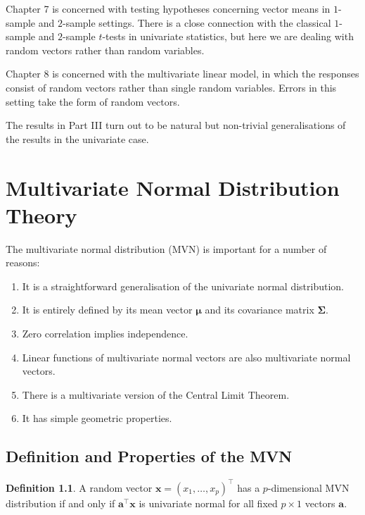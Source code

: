 \documentclass[]{book}
\providecommand{\tightlist}{%
  \setlength{\itemsep}{0pt}\setlength{\parskip}{0pt}}
\theoremstyle{definition}
\newtheorem{definition}{Definition}[chapter]
\theoremstyle{definition}
\theoremstyle{definition}
\theoremstyle{remark}
\begin{document}
Chapter 7 is concerned with testing hypotheses concerning vector means in \(1\)-sample and \(2\)-sample settings. There is a close connection with the classical \(1\)-sample and \(2\)-sample \(t\)-tests in univariate statistics, but here we are dealing with random vectors rather than random variables.

Chapter 8 is concerned with the multivariate linear model, in which the responses consist of random vectors rather than single random variables. Errors in this setting take the form of random vectors.

The results in Part III turn out to be natural but non-trivial generalisations of the results in the univariate case.

\hypertarget{multinormal}{%
\chapter{Multivariate Normal Distribution Theory}\label{multinormal}}

The multivariate normal distribution (MVN) is important for a number of reasons:

\begin{enumerate}
\def\labelenumi{\arabic{enumi}.}
\tightlist
\item
  It is a straightforward generalisation of the univariate normal distribution.
\item
  It is entirely defined by its mean vector \(\boldsymbol \mu\) and its covariance matrix \(\boldsymbol \Sigma\).
\item
  Zero correlation implies independence.
\item
  Linear functions of multivariate normal vectors are also multivariate normal vectors.
\item
  There is a multivariate version of the Central Limit Theorem.
\item
  It has simple geometric properties.
\end{enumerate}

\hypertarget{definition-and-properties-of-the-mvn}{%
\section{Definition and Properties of the MVN}\label{definition-and-properties-of-the-mvn}}

\begin{definition}
\protect\hypertarget{def:mvn}{}{\label{def:mvn} }A random vector \(\boldsymbol x=(x_1, \ldots , x_p)^\top\) has a \(p\)-dimensional MVN distribution if and only if \(\boldsymbol a^\top \boldsymbol x\) is univariate normal for all fixed \(p \times 1\) vectors \(\boldsymbol a\).
\end{definition}
\end{document}
